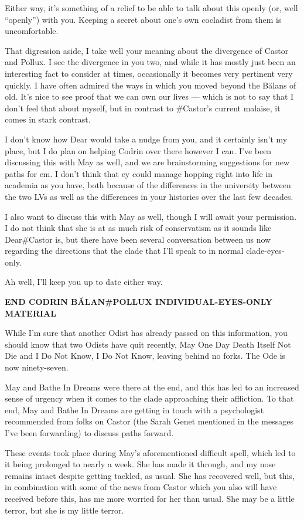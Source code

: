 Either way, it's something of a relief to be able to talk about this openly (or, well ``openly'') with you. Keeping a secret about one's own cocladist from them is uncomfortable.

That digression aside, I take well your meaning about the divergence of Castor and Pollux. I see the divergence in you two, and while it has mostly just been an interesting fact to consider at times, occasionally it becomes very pertinent very quickly. I have often admired the ways in which you moved beyond the Bălans of old. It's nice to see proof that we can own our lives — which is not to say that I don't feel that about myself, but in contrast to \#Castor's current malaise, it comes in stark contrast.

I don't know how Dear would take a nudge from you, and it certainly isn't my place, but I do plan on helping Codrin over there however I can. I've been discussing this with May as well, and we are brainstorming suggestions for new paths for em. I don't think that ey could manage hopping right into life in academia as you have, both because of the differences in the university between the two LVs as well as the differences in your histories over the last few decades.

I also want to discuss this with May as well, though I will await your permission. I do not think that she is at as much risk of conservatism as it sounds like Dear\#Castor is, but there have been several conversation between us now regarding the directions that the clade that I'll speak to in normal clade-eyes-only.

Ah well, I'll keep you up to date either way.

\textbf{END CODRIN BĂLAN\#POLLUX INDIVIDUAL-EYES-ONLY MATERIAL}

While I'm sure that another Odist has already passed on this information, you should know that two Odists have quit recently, May One Day Death Itself Not Die and I Do Not Know, I Do Not Know, leaving behind no forks. The Ode is now ninety-seven.

May and Bathe In Dreams were there at the end, and this has led to an increased sense of urgency when it comes to the clade approaching their affliction. To that end, May and Bathe In Dreams are getting in touch with a psychologist recommended from folks on Castor (the Sarah Genet mentioned in the messages I've been forwarding) to discuss paths forward.

These events took place during May's aforementioned difficult spell, which led to it being prolonged to nearly a week. She has made it through, and my nose remains intact despite getting tackled, as usual. She has recovered well, but this, in combination with some of the news from Castor which you also will have received before this, has me more worried for her than usual. She may be a little terror, but she is my little terror.

